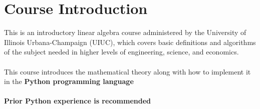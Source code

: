 \section{Course Introduction}
This is an introductory linear algebra course administered by the University of Illinois Urbana-Champaign (UIUC), which covers basic definitions and algorithms of the subject needed in higher levels of engineering, science, and economics. \\\\
This course introduces the mathematical theory along with how to implement it in the \textbf{Python programming language} \\\\
\textbf{Prior Python experience is recommended}

